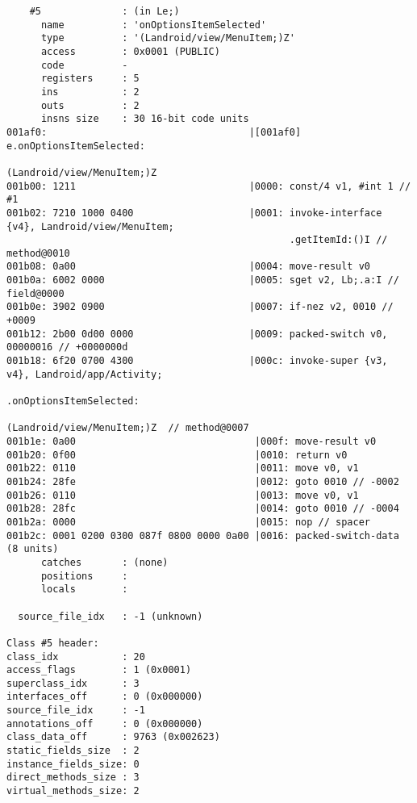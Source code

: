\begin{lstlisting}
    #5              : (in Le;)
      name          : 'onOptionsItemSelected'
      type          : '(Landroid/view/MenuItem;)Z'
      access        : 0x0001 (PUBLIC)
      code          -
      registers     : 5
      ins           : 2
      outs          : 2
      insns size    : 30 16-bit code units
001af0:                                   |[001af0] e.onOptionsItemSelected:
                                                    (Landroid/view/MenuItem;)Z
001b00: 1211                              |0000: const/4 v1, #int 1 // #1
001b02: 7210 1000 0400                    |0001: invoke-interface {v4}, Landroid/view/MenuItem;
                                                 .getItemId:()I // method@0010
001b08: 0a00                              |0004: move-result v0
001b0a: 6002 0000                         |0005: sget v2, Lb;.a:I // field@0000
001b0e: 3902 0900                         |0007: if-nez v2, 0010 // +0009
001b12: 2b00 0d00 0000                    |0009: packed-switch v0, 00000016 // +0000000d
001b18: 6f20 0700 4300                    |000c: invoke-super {v3, v4}, Landroid/app/Activity;
                                                 .onOptionsItemSelected:
                                                 (Landroid/view/MenuItem;)Z  // method@0007
001b1e: 0a00                               |000f: move-result v0
001b20: 0f00                               |0010: return v0
001b22: 0110                               |0011: move v0, v1
001b24: 28fe                               |0012: goto 0010 // -0002
001b26: 0110                               |0013: move v0, v1
001b28: 28fc                               |0014: goto 0010 // -0004
001b2a: 0000                               |0015: nop // spacer
001b2c: 0001 0200 0300 087f 0800 0000 0a00 |0016: packed-switch-data (8 units)
      catches       : (none)
      positions     :
      locals        :

  source_file_idx   : -1 (unknown)

Class #5 header:
class_idx           : 20
access_flags        : 1 (0x0001)
superclass_idx      : 3
interfaces_off      : 0 (0x000000)
source_file_idx     : -1
annotations_off     : 0 (0x000000)
class_data_off      : 9763 (0x002623)
static_fields_size  : 2
instance_fields_size: 0
direct_methods_size : 3
virtual_methods_size: 2


\end{lstlisting}
